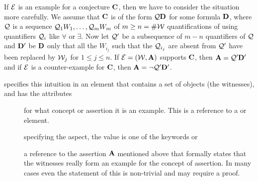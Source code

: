 If ${\cal E}$ is an example for a conjecture ${\bf C}$, then we have to consider the
situation more carefully. We assume that ${\bf C}$ is of the form ${\cal Q}{\bf D}$ for some
formula ${\bf D}$, where ${\cal Q}$ is a sequence ${\cal Q}_1W_1,\ldots,{\cal Q}_mW_m$ of $m\geq
n=\#{\cal W}$ quantifications of using quantifiers ${\cal Q}_i$ like $\forall$ or $\exists$.
Now let ${\cal Q}'$ be a subsequence of $m-n$ quantifiers of ${\cal Q}$ and ${\bf D}'$ be ${\bf D}$
only that all the $W_{i_j}$ such that the ${\cal Q}_{i_j}$ are absent from ${\cal Q}'$ have
been replaced by ${\cal W}_j$ for $1\leq j\leq n$.  If ${\cal E}=({\cal W},{\bf A})$ supports ${\bf C}$,
then ${\bf A}={\cal Q}'{\bf D}'$ and if ${\cal E}$ is a counter-example for ${\bf C}$, then
${\bf A}=\neg{\cal Q}'{\bf D}'$.
  
{\omdoc} specifies this intuition in an {} element that contains a
set of {\openmath} objects (the witnesses), and has the attributes
\begin{description}
\item[{}] for what concept or assertion it is  an example.
  This is a reference to a {} or {} element.
\item[{}] specifying the aspect, the value is one of the
  keywords {} or {}
\item[{}] a reference to the assertion ${\bf A}$
  mentioned above that formally states that the witnesses really form an example for the
  concept of assertion. In many cases even the statement of this is non-trivial
  and may require a proof.
\end{description}

